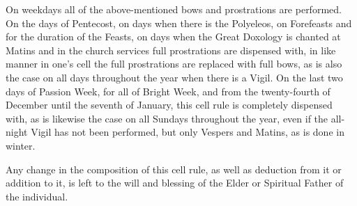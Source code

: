 On weekdays all of the above-mentioned bows and prostrations are performed. On the days of Pentecost, on days when there is the Polyeleos, on Forefeasts and for the duration of the Feasts, on days when the Great Doxology is chanted at Matins and in the church services full prostrations are dispensed with, in like manner in one's cell the full prostrations are replaced with full bows, as is also the case on all days throughout the year when there is a Vigil. On the last two days of Passion Week, for all of Bright Week, and from the twenty-fourth of December until the seventh of January, this cell rule is completely dispensed with, as is likewise the case on all Sundays throughout the year, even if the all-night Vigil has not been performed, but only Vespers and Matins, as is done in winter.

Any change in the composition of this cell rule, as well as deduction from it or addition to it, is left to the will and blessing of the Elder or Spiritual Father of the individual.